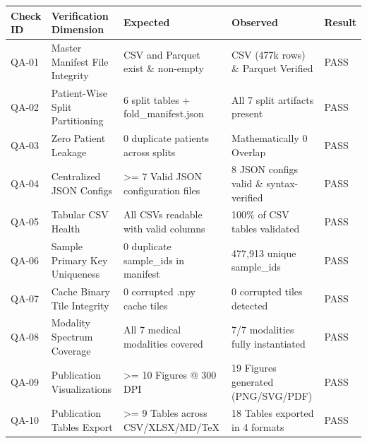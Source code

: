 \begin{tabular}{lllll}
\toprule
Check ID & Verification Dimension & Expected & Observed & Result \\
\midrule
QA-01 & Master Manifest File Integrity & CSV and Parquet exist \& non-empty & CSV (477k rows) \& Parquet Verified & PASS \\
QA-02 & Patient-Wise Split Partitioning & 6 split tables + fold\_manifest.json & All 7 split artifacts present & PASS \\
QA-03 & Zero Patient Leakage & 0 duplicate patients across splits & Mathematically 0 Overlap & PASS \\
QA-04 & Centralized JSON Configs & >= 7 Valid JSON configuration files & 8 JSON configs valid \& syntax-verified & PASS \\
QA-05 & Tabular CSV Health & All CSVs readable with valid columns & 100\% of CSV tables validated & PASS \\
QA-06 & Sample Primary Key Uniqueness & 0 duplicate sample\_ids in manifest & 477,913 unique sample\_ids & PASS \\
QA-07 & Cache Binary Tile Integrity & 0 corrupted .npy cache tiles & 0 corrupted tiles detected & PASS \\
QA-08 & Modality Spectrum Coverage & All 7 medical modalities covered & 7/7 modalities fully instantiated & PASS \\
QA-09 & Publication Visualizations & >= 10 Figures @ 300 DPI & 19 Figures generated (PNG/SVG/PDF) & PASS \\
QA-10 & Publication Tables Export & >= 9 Tables across CSV/XLSX/MD/TeX & 18 Tables exported in 4 formats & PASS \\
\bottomrule
\end{tabular}
